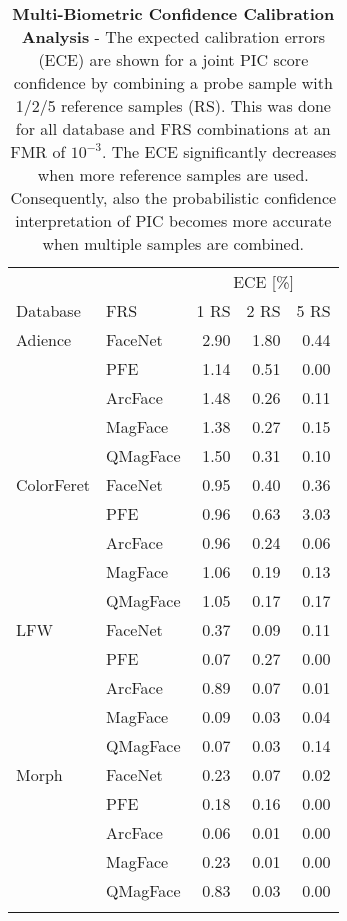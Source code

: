 \documentclass[10pt,twocolumn,letterpaper]{article}
\begin{document}
\begin{table}[ht]
\small
\renewcommand{\arraystretch}{1.0}
\setlength{\tabcolsep}{7pt}
\centering
\caption{\textbf{Multi-Biometric Confidence Calibration Analysis} - The expected calibration errors (ECE) are shown for a joint PIC score confidence by combining a probe sample with 1/2/5 reference samples (RS).
This was done for all database and FRS combinations at an FMR of $10^{-3}$.
The ECE significantly decreases when more reference samples are used. Consequently, also the probabilistic confidence interpretation of PIC becomes more accurate when multiple samples are combined.
}\label{tab:MultiCalibrationAnalysis}
\begin{tabular}{llrrr}
\Xhline{2\arrayrulewidth}
           &          & \multicolumn{3}{c}{ECE [\%]}     \\
           \cmidrule(rl){3-5}
Database   & FRS      & \multicolumn{1}{c}{1 RS}& \multicolumn{1}{c}{2 RS} & \multicolumn{1}{c}{5 RS}   \\
\hline
Adience    & FaceNet  &2.90&1.80 &0.44  \\
           & PFE      &1.14 & 0.51 &  0.00    \\
           & ArcFace  &1.48&0.26 &0.11\\
           & MagFace  &1.38&0.27&0.15\\
           & QMagFace &1.50&0.31&0.10\\
\hline
ColorFeret & FaceNet  &0.95& 0.40 &0.36\\
           & PFE     & 0.96 & 0.63 & 3.03    \\
           & ArcFace  &0.96& 0.24&0.06\\
           & MagFace &1.06&0.19&0.13\\
           & QMagFace &1.05&0.17&0.17\\
\hline
LFW        & FaceNet  &0.37& 0.09&0.11\\
           & PFE      & 0.07& 0.27 & 0.00 \\
           & ArcFace &0.89&0.07&0.01\\
           & MagFace &0.09&0.03&0.04\\
           & QMagFace &0.07&0.03&0.14    \\
\hline
Morph      & FaceNet  & 0.23&0.07  &0.02\\
           & PFE      &  0.18 & 0.16 & 0.00 \\
           & ArcFace &0.06&0.01  &0.00\\
           & MagFace  &0.23& 0.01 &0.00\\
           & QMagFace &0.83&0.03&0.00\\
\Xhline{2\arrayrulewidth}
\end{tabular}
\end{table}
\end{document}
